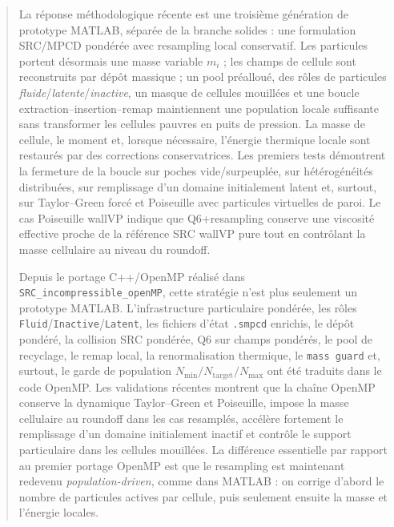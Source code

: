 \documentclass[11pt,a4paper]{article}
\begin{document}
\begin{abstract}
La réponse méthodologique récente est une troisième génération de prototype MATLAB, séparée de la branche solides : une formulation SRC/MPCD pondérée avec resampling local conservatif. Les particules portent désormais une masse variable $m_i$ ; les champs de cellule sont reconstruits par dépôt massique ; un pool préalloué, des rôles de particules \emph{fluide}/\emph{latente}/\emph{inactive}, un masque de cellules mouillées et une boucle extraction--insertion--remap maintiennent une population locale suffisante sans transformer les cellules pauvres en puits de pression. La masse de cellule, le moment et, lorsque nécessaire, l'énergie thermique locale sont restaurés par des corrections conservatrices. Les premiers tests démontrent la fermeture de la boucle sur poches vide/surpeuplée, sur hétérogénéités distribuées, sur remplissage d'un domaine initialement latent et, surtout, sur Taylor--Green forcé et Poiseuille avec particules virtuelles de paroi. Le cas Poiseuille wallVP indique que Q6+resampling conserve une viscosité effective proche de la référence SRC wallVP pure tout en contrôlant la masse cellulaire au niveau du roundoff.


Depuis le portage C++/OpenMP réalisé dans \texttt{SRC\_incompressible\_openMP}, cette stratégie n'est plus seulement un prototype MATLAB. L'infrastructure particulaire pondérée, les rôles \texttt{Fluid}/\texttt{Inactive}/\texttt{Latent}, les fichiers d'état \texttt{.smpcd} enrichis, le dépôt pondéré, la collision SRC pondérée, Q6 sur champs pondérés, le pool de recyclage, le remap local, la renormalisation thermique, le \texttt{mass guard} et, surtout, le garde de population $N_{\min}/N_{\mathrm{target}}/N_{\max}$ ont été traduits dans le code OpenMP. Les validations récentes montrent que la chaîne OpenMP conserve la dynamique Taylor--Green et Poiseuille, impose la masse cellulaire au roundoff dans les cas resamplés, accélère fortement le remplissage d'un domaine initialement inactif et contrôle le support particulaire dans les cellules mouillées. La différence essentielle par rapport au premier portage OpenMP est que le resampling est maintenant redevenu \emph{population-driven}, comme dans MATLAB : on corrige d'abord le nombre de particules actives par cellule, puis seulement ensuite la masse et l'énergie locales.



\end{abstract}
\end{document}
